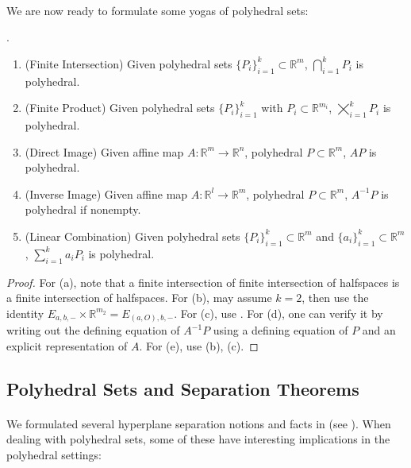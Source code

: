 \paragraph{}We are now ready to formulate some yogas of polyhedral sets:
\begin{prop}\label{prop:017-polyhedral-yoga}.
	\begin{enumerate}[label=(\alph*)]
		\item (Finite Intersection) Given polyhedral sets $\{P_i\}_{i=1}^{k}\subset \mathbb{R}^m$, $\bigcap_{i=1}^kP_i$ is polyhedral.
		\item (Finite Product) Given polyhedral sets $\{P_i\}_{i=1}^{k}$ with $P_i\subset \mathbb{R}^{m_i}$, $\bigtimes_{i=1}^kP_i$ is polyhedral.
		\item (Direct Image) Given affine map $A:\mathbb{R}^m\to \mathbb{R}^n$, polyhedral $P\subset \mathbb{R}^m$, $AP$ is polyhedral.
		\item (Inverse Image) Given affine map $A:\mathbb{R}^l\to \mathbb{R}^m$, polyhedral $P\subset \mathbb{R}^m$, $A^{-1}P$ is polyhedral if nonempty.
		\item (Linear Combination) Given polyhedral sets $\{P_i\}_{i=1}^{k}\subset \mathbb{R}^m$ and $\{a_i\}_{i=1}^k\subset \mathbb{R}^m$, $\sum_{i=1}^ka_iP_i$ is polyhedral.
	\end{enumerate}
\end{prop}
\begin{proof}
	For (a), note that a finite intersection of finite intersection of halfspaces is a finite intersection of halfspaces. For (b), may assume $k=2$, then use the identity $E_{a,b,-}\times \mathbb{R}^{m_2}=E_{(a,O),b,-}$. For (c), use . For (d), one can verify it by writing out the defining equation of $A^{-1}P$ using a defining equation of $P$ and an explicit representation of $A$. For (e), use (b), (c).
\end{proof}

\subsection{Polyhedral Sets and Separation Theorems}

\paragraph{}We formulated several hyperplane separation notions and facts in  (see ). When dealing with polyhedral sets, some of these have interesting implications in the polyhedral settings:

